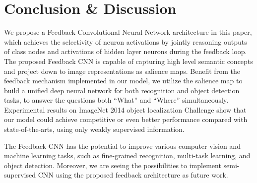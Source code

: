 \section{Conclusion \& Discussion}
\label{sec:conclusion}

We propose a Feedback Convolutional Neural Network architecture in this paper, which achieves the selectivity of neuron activations by jointly reasoning outputs of class nodes and activations of hidden layer neurons during the feedback loop. The proposed Feedback CNN is capable of capturing high level semantic concepts and project down to image representations as salience maps. Benefit from the feedback mechanism implemented in our model, we utilize the salience map to build a unified deep neural network for both recognition and object detection tasks, to answer the questions both ``What'' and ``Where'' simultaneously. Experimental results on ImageNet 2014 object localization Challenge show that our model could achieve competitive or even better performance compared with state-of-the-arts, using only weakly supervised information.

The Feedback CNN has the potential to improve various computer vision and machine learning tasks, such as fine-grained recognition, multi-task learning, and object detection. Moreover, we are seeing the possibilities to implement semi-supervised CNN using the proposed feedback architecture as future work.

\begin{comment}
We proposes a Feedback Convolusional Neural Networks for class model visualization and object localization.
Our Feedback Neural Networks can infer the hidden neuron status given the bottom level input image and top level class labels.
Experiments on ImageNet localization challengeindicates that our model is superior in weakly supervised object localization, and further experiments demonstrate its powerfulness in distinguishing objects, even under cluttered backgrounds with multiple objects.

(1) Robust
(2) Multi-task
(3)

Figure 1: We show the powerfulness of feedback neural networks on class model visualization and object localizations, even when an image contains very cluttered background and lots of salient objects. Note that we simply use a pertained feedforward multi-class convnets (GoogleNet) model [] trained with ImageNet dataset where each training image only contains one object and no further training is involved. The feedback neural nets are able to adapt its middle-level hidden layers (usually represents object parts) by combining the bottom-up feedforward image features as well as top-down feedback semantic information. (a) input image (b) class model visualization given the class label: panda, elephant, gorilla, tiger, lion, (c) final object localization results based on the class model visualization.
\end{comment}
